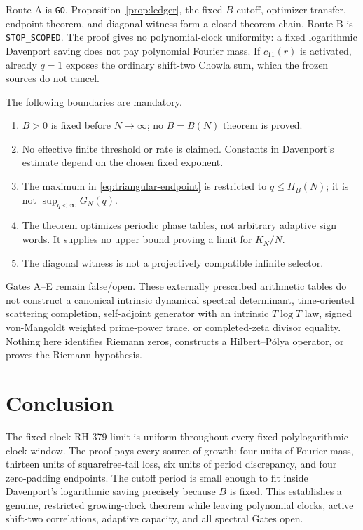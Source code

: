 \documentclass[11pt]{article}
\theoremstyle{definition}
\theoremstyle{remark}
\begin{document}
Route A is \texttt{GO}.  Proposition~\ref{prop:ledger}, the fixed-$B$
cutoff, optimizer transfer, endpoint theorem, and diagonal witness form a
closed theorem chain.  Route B is \texttt{STOP\_SCOPED}.  The proof gives
no polynomial-clock uniformity: a fixed logarithmic Davenport saving does
not pay polynomial Fourier mass.  If $c_{11}(r)$ is activated, already
$q=1$ exposes the ordinary shift-two Chowla sum, which the frozen sources
do not cancel.

The following boundaries are mandatory.
\begin{enumerate}[leftmargin=2em]
 \item $B>0$ is fixed before $N\to\infty$; no $B=B(N)$ theorem is proved.
 \item No effective finite threshold or rate is claimed.  Constants in
       Davenport's estimate depend on the chosen fixed exponent.
 \item The maximum in \eqref{eq:triangular-endpoint} is restricted to
       $q\le H_B(N)$; it is not $\sup_{q<\infty}G_N(q)$.
 \item The theorem optimizes periodic phase tables, not arbitrary adaptive
       sign words.  It supplies no upper bound proving a limit for $K_N/N$.
 \item The diagonal witness is not a projectively compatible infinite
       selector.
\end{enumerate}

Gates A--E remain false/open.  These externally prescribed arithmetic
tables do not construct a canonical intrinsic dynamical spectral
determinant, time-oriented scattering completion, self-adjoint generator
with an intrinsic $T\log T$ law, signed von-Mangoldt weighted prime-power
trace, or completed-zeta divisor equality.  Nothing here identifies
Riemann zeros, constructs a Hilbert--P\'olya operator, or proves the Riemann
hypothesis.

\section{Conclusion}

The fixed-clock RH-379 limit is uniform throughout every fixed
polylogarithmic clock window.  The proof pays every source of growth: four
units of Fourier mass, thirteen units of squarefree-tail loss, six units of
period discrepancy, and four zero-padding endpoints.  The cutoff period is
small enough to fit inside Davenport's logarithmic saving precisely because
$B$ is fixed.  This establishes a genuine, restricted growing-clock theorem
while leaving polynomial clocks, active shift-two correlations, adaptive
capacity, and all spectral Gates open.
\end{document}
